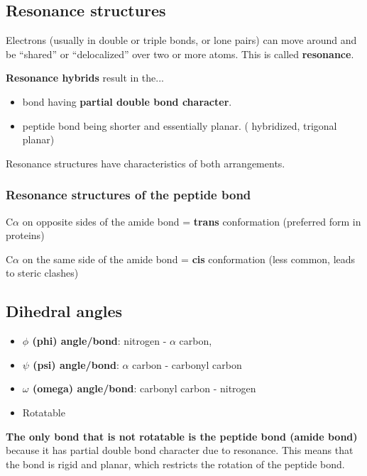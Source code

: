 \documentclass[letterpaper, 12pt]{article}
\begin{document}
\subsection*{Resonance structures}

Electrons (usually in double or triple bonds, or lone pairs) can move around
and be ``shared'' or ``delocalized'' over two or more atoms. This is called \textbf{resonance}.

\textbf{Resonance hybrids} result in the...

\begin{itemize}
\item {} bond having \textbf{partial double bond character}.
\item peptide bond being shorter and essentially planar. ( hybridized, trigonal planar)
\end{itemize}

Resonance structures have characteristics of both arrangements.

\subsubsection*{Resonance structures of the peptide bond}

C$\alpha$ on opposite sides of the amide bond = \textbf{trans} conformation (preferred form in proteins)

C$\alpha$ on the same side of the amide bond = \textbf{cis} conformation (less common, leads to steric clashes)

\subsection*{Dihedral angles}

\begin{itemize}
\item \textbf{$\phi$ (phi) angle/bond}: nitrogen - $\alpha$ carbon, 
\item \textbf{$\psi$ (psi) angle/bond}: $\alpha$ carbon - carbonyl carbon 
\item \textbf{$\omega$ (omega) angle/bond}: carbonyl carbon - nitrogen 
\item Rotatable
\end{itemize}

\textbf{The only bond that is not rotatable is the peptide bond (amide bond)} because it has partial double bond character due to resonance. This means that the  bond is rigid and planar, which restricts the rotation of the peptide bond.
\end{document}
